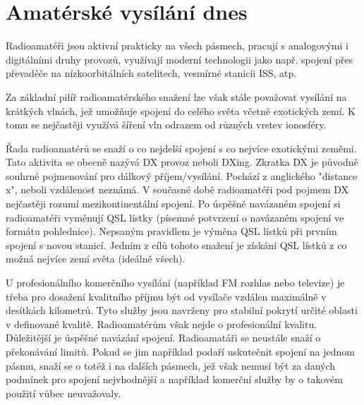 \section{Amatérské vysílání dnes}
\label{radioamateri_dnes}

Radioamatéři jsou aktivní prakticky na všech pásmech, pracují s analogovými i
digitálními druhy provozů, využívají moderní technologii jako např. spojení přes
převaděče na nízkoorbitálních satelitech, vesmírné stanicii ISS, atp. 

Za základní pilíř radioamatérského snažení lze však stále považovat vysílání na
krátkých vlnách, jež umožňuje spojení do celého světa včetně exotických zemí. K
tomu se nejčastěji využívá šíření vln odrazem od různých vrstev ionosféry.

Řada radioamatérů se snaží o co nejdelší spojení s co nejvíce exotickými zeměmi.
Tato aktivita se obecně nazývá DX provoz neboli DXing. Zkratka DX je původně souhrné pojmenování
pro dálkový příjem/vysílání. Pochází z anglického "distance
x", neboli vzdálenost neznámá. V současné době radioamatéři pod pojmem DX
nejčastěji rozumí mezikontinentální spojení.
Po úspěšně navázaném spojení si radioamatéři vyměnují QSL lístky (písemné potvrzení o
navázaném spojení ve formátu pohlednice). Nepsaným pravidlem je výměna QSL
lístků při prvním spojení s novou stanicí. Jedním z cílů tohoto snažení je
získání QSL lístků z co možná nejvíce zemí světa (ideálně všech).

U profesionálního komerčního vysílání (například FM rozhlas nebo
televize) je třeba pro dosažení kvalitního příjmu být od vysílače vzdálen maximálně
v desítkách kilometrů. Tyto služby jsou navrženy pro stabilní pokrytí určité
oblasti v definované kvalitě. Radioamatérům však nejde o profesionální kvalitu.
Důležitější je úspěšné navázání spojení. Radioamatáři se neustále snaží o překonávání limitů.
Pokud se jim například podaří uskutečnit spojení na jednom pásmu,
snaží se o totéž i na dalších pásmech, jež však nemusí být za daných
podmínek pro spojení nejvhodnější a například komerční služby by o takovém
použití vůbec neuvažovaly.

